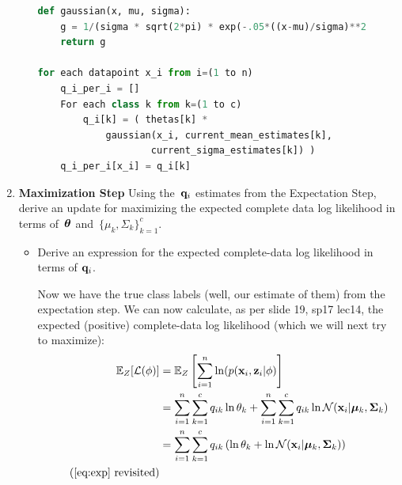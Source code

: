 \documentclass[submit]{harvardml}
\newenvironment{answer}{%
\color{answergreen}\sffamily\large}{}
\newcommand{\bx}{\mathbf{x}} %
\newcommand{\bz}{\mathbf{z}} %
\begin{document}
\begin{enumerate}
\begin{itemize}
\begin{answer}
\begin{lstlisting}[frame=single, language=python]
def gaussian(x, mu, sigma):
    g = 1/(sigma * sqrt(2*pi) * exp(-.05*((x-mu)/sigma)**2
    return g

for each datapoint x_i from i=(1 to n)
    q_i_per_i = []
    For each class k from k=(1 to c)
        q_i[k] = ( thetas[k] * 
            gaussian(x_i, current_mean_estimates[k], 
                    current_sigma_estimates[k]) )
    q_i_per_i[x_i] = q_i[k]
\end{lstlisting}

				\end{answer}

		\end{itemize}

    \item \textbf{Maximization Step}
        Using the~$\mathbf{q}_i$ estimates from the Expectation Step, derive an update for maximizing
        the expected complete data log likelihood in terms of~$\boldsymbol{\theta}$ and~$\{ \mu_k,\Sigma_k
        \}^c_{k=1}$.

        \begin{itemize} 
            \item Derive an expression for the expected complete-data log likelihood in
                terms of $\mathbf{q}_i$.

                \begin{answer}

                    Now we have the true class labels (well, our estimate of them) from the
                    expectation step. We can now calculate, as per slide 19, sp17 lec14, the
                    expected (positive) complete-data log likelihood (which we will next try to
                    maximize):
                    \begin{align}
                        \mathbb{E}_Z[\mathcal{L}(\phi)] &= \mathbb{E}_Z \left[ \sum_{i=1}^n \ln(p(\bx_i,
                        \bz_i | \phi) \right]  \\
                        &= \sum_{i=1}^n \sum_{k=1}^c q_{ik} \ln\theta_k + 
                        \sum_{i=1}^n \sum_{k=1}^c q_{ik} \ln \mathcal{N}(\bx_i | \bmu_k,
                        \bSigma_k) \\
                        &= \sum_{i=1}^n \sum_{k=1}^c q_{ik} \left(\ln\theta_k + 
                    \ln \mathcal{N}(\bx_i | \bmu_k, \bSigma_k ) \right) \\ \tag{\ref{eq:exp} revisited}
                \end{align}


\end{answer}
\end{itemize}
\end{enumerate}
\end{document}
